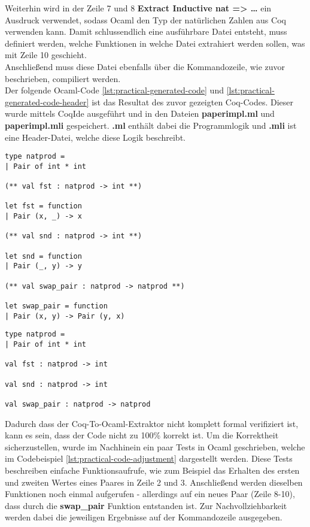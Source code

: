 Weiterhin wird in der Zeile 7 und 8 \textbf{Extract Inductive nat => \dots} ein Ausdruck verwendet, sodass Ocaml den Typ der natürlichen Zahlen aus Coq verwenden kann. 
Damit schlussendlich eine ausführbare Datei entsteht, muss definiert werden, welche Funktionen in welche Datei extrahiert werden sollen, was mit Zeile 10 geschieht.\\
Anschließend muss diese Datei ebenfalls über die Kommandozeile, wie zuvor beschrieben, compiliert werden.
\\
Der folgende Ocaml-Code \ref{lst:practical-generated-code} und \ref{lst:practical-generated-code-header} ist das Resultat des zuvor gezeigten Coq-Codes. Dieser wurde mittels CoqIde ausgeführt und in den Dateien \textbf{paperimpl.ml} und \textbf{paperimpl.mli} gespeichert. \textbf{.ml} enthält dabei die Programmlogik und \textbf{.mli} ist eine Header-Datei, welche diese Logik beschreibt.
\begin{lstlisting}[language=coq,firstnumber=1,caption=Ocaml Code Resultat (paperimpl.ml),label=lst:practical-generated-code]
type natprod =
| Pair of int * int

(** val fst : natprod -> int **)

let fst = function
| Pair (x, _) -> x

(** val snd : natprod -> int **)

let snd = function
| Pair (_, y) -> y

(** val swap_pair : natprod -> natprod **)

let swap_pair = function
| Pair (x, y) -> Pair (y, x)
\end{lstlisting}
\begin{lstlisting}[language=coq,firstnumber=1,caption=Ocaml Code Resultat (paperimpl.mli),label=lst:practical-generated-code-header]
type natprod =
| Pair of int * int

val fst : natprod -> int

val snd : natprod -> int

val swap_pair : natprod -> natprod
\end{lstlisting}
Dadurch dass der Coq-To-Ocaml-Extraktor nicht komplett formal verifiziert ist, kann es sein, dass der Code nicht zu 100\% korrekt ist. Um die Korrektheit sicherzustellen, wurde im Nachhinein ein paar Tests in Ocaml geschrieben, welche im Codebeispiel \ref{lst:practical-code-adjustment} dargestellt werden. Diese Tests beschreiben einfache Funktionsaufrufe, wie zum Beispiel das Erhalten des ersten und zweiten Wertes eines Paares in Zeile 2 und 3. Anschließend werden dieselben Funktionen noch einmal aufgerufen - allerdings auf ein neues Paar (Zeile 8-10), dass durch die \textbf{swap\_pair} Funktion entstanden ist. Zur Nachvollziehbarkeit werden dabei die jeweiligen Ergebnisse auf der Kommandozeile ausgegeben.
